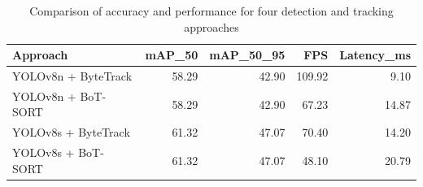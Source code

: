 \begin{table}
\caption{Comparison of accuracy and performance for four detection and tracking approaches}
\label{tab:models_comparison_dev}
\begin{tabular}{lrrrr}
\toprule
Approach & mAP_50 & mAP_50_95 & FPS & Latency_ms \\
\midrule
YOLOv8n + ByteTrack & 58.29 & 42.90 & 109.92 & 9.10 \\
YOLOv8n + BoT-SORT & 58.29 & 42.90 & 67.23 & 14.87 \\
YOLOv8s + ByteTrack & 61.32 & 47.07 & 70.40 & 14.20 \\
YOLOv8s + BoT-SORT & 61.32 & 47.07 & 48.10 & 20.79 \\
\bottomrule
\end{tabular}
\end{table}
